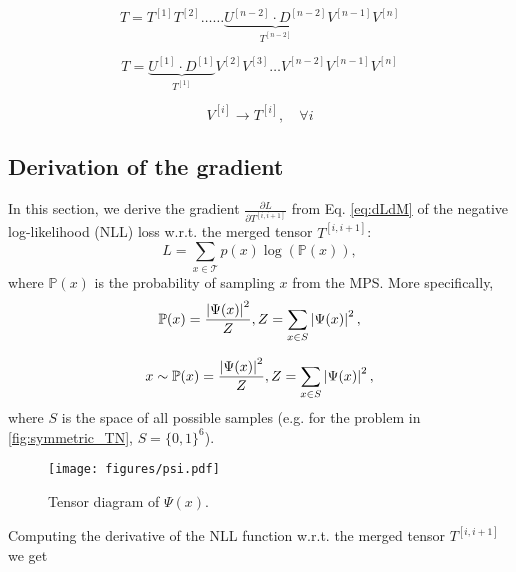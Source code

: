 \begin{equation}
	T = T^{[1]} T ^{[2]} \dots  \dots \underbrace{ U^{[n-2]}\cdot D^{[n-2]} }_{T^{[n-2]}} V^{[n-1]} V^{[n]}
\end{equation}

\begin{equation}
	T = \underbrace{U^{[1]} \cdot D^{[1]}}_{T^{[1]}} V^{[2]} V^{[3]} \dots V^{[n-2]} V^{[n-1]} V^{[n]}
\end{equation}



\begin{equation}
	V^{[i]} \longrightarrow T^{[i]}, \hspace{1em} \forall i
\end{equation}


\subsection{Derivation of the gradient}
\label{appendix:gradient}

In this section, we derive the gradient $\frac{\partial L}{\partial T^{[i, i+1]}}$ from Eq. \eqref{eq:dLdM} of the negative log-likelihood (NLL) loss w.r.t. the merged tensor $T^{[i, i+1]}$:
\begin{equation}
    L = \sum_{x\in\mathcal T}p(x)\log(\mathbb{P}(x)),
\end{equation}
where $\mathbb{P}(x)$ is the probability of sampling $x$ from the MPS. More specifically,
\begin{equation}
    \mathbb{P}(x) = \frac{\left|\Psi(x)\right|^2}{Z}, \\
    Z=\sum_{x\in S}\left|\Psi(x)\right|^2,
\end{equation}

\begin{equation}
    x\sim \mathbb{P}(x) = \frac{\left|\Psi(x)\right|^2}{Z}, \\
    Z=\sum_{x\in S}\left|\Psi(x)\right|^2,
\end{equation}
where $S$ is the space of all possible samples (e.g. for the problem in \ref{fig:symmetric_TN}, $S=\{0,1\}^6$).

\begin{figure}[ht]
    \centering
    \texttt{[image: figures/psi.pdf]}
    \caption{Tensor diagram of $\Psi(x)$.}
    \label{fig:psi}
\end{figure}

Computing the derivative of the NLL function w.r.t. the merged tensor $T^{[i,i+1]}$ we get

